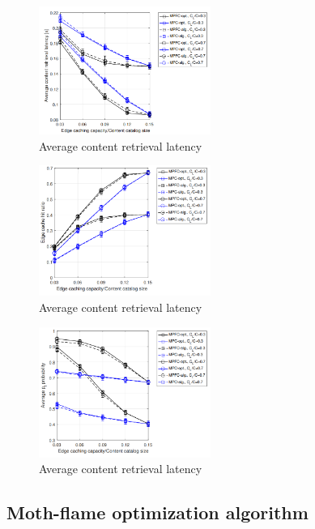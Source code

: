 \documentclass[conference]{IEEEtran}
\begin{document}
	\begin{figure}
		\centering
		\includegraphics[width=0.5\textwidth]{figures/fresh-latency.png}
		\caption{Average content retrieval latency \cite{caching-2}}
		\label{fig:lifetime-latency}
	\end{figure}
	\begin{figure}
		\centering
		\includegraphics[width=0.5\textwidth]{figures/fresh-hitrate.png}
		\caption{Average content retrieval latency \cite{caching-2}}
		\label{fig:lifetime-hitrate}
	\end{figure}
	\begin{figure}
		\centering
		\includegraphics[width=0.5\textwidth]{figures/fresh-freshness.png}
		\caption{Average content retrieval latency \cite{caching-2}}
		\label{fig:lifetime-freshness}
	\end{figure}

	\subsection{Moth-flame optimization algorithm}
	\label{sec:mfo-caching}
\end{document}
